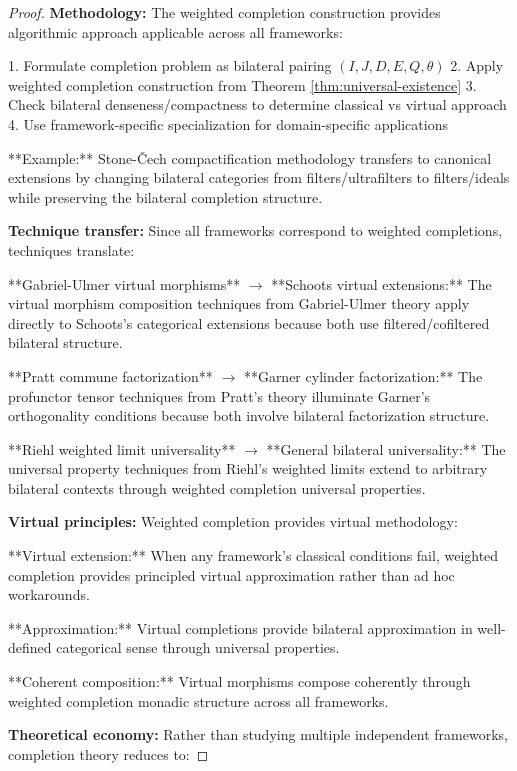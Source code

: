 \documentclass[11pt]{article}
\theoremstyle{plain}
\theoremstyle{definition}
\theoremstyle{remark}
\begin{document}
\begin{proof}
\textbf{Methodology:} The weighted completion construction provides algorithmic approach applicable across all frameworks:

1. Formulate completion problem as bilateral pairing $(I, J, D, E, Q, \theta)$
2. Apply weighted completion construction from Theorem \ref{thm:universal-existence}
3. Check bilateral denseness/compactness to determine classical vs virtual approach
4. Use framework-specific specialization for domain-specific applications

**Example:** Stone-\v{C}ech compactification methodology transfers to canonical extensions by changing bilateral categories from filters/ultrafilters to filters/ideals while preserving the bilateral completion structure.

\textbf{Technique transfer:} Since all frameworks correspond to weighted completions, techniques translate:

**Gabriel-Ulmer virtual morphisms** $\to$ **Schoots virtual extensions:** The virtual morphism composition techniques from Gabriel-Ulmer theory apply directly to Schoots's categorical extensions because both use filtered/cofiltered bilateral structure.

**Pratt commune factorization** $\to$ **Garner cylinder factorization:** The profunctor tensor techniques from Pratt's theory illuminate Garner's orthogonality conditions because both involve bilateral factorization structure.

**Riehl weighted limit universality** $\to$ **General bilateral universality:** The universal property techniques from Riehl's weighted limits extend to arbitrary bilateral contexts through weighted completion universal properties.

\textbf{Virtual principles:} Weighted completion provides virtual methodology:

**Virtual extension:** When any framework's classical conditions fail, weighted completion provides principled virtual approximation rather than ad hoc workarounds.

**Approximation:** Virtual completions provide bilateral approximation in well-defined categorical sense through universal properties.

**Coherent composition:** Virtual morphisms compose coherently through weighted completion monadic structure across all frameworks.

\textbf{Theoretical economy:} Rather than studying multiple independent frameworks, completion theory reduces to:


\end{proof}
\end{document}
